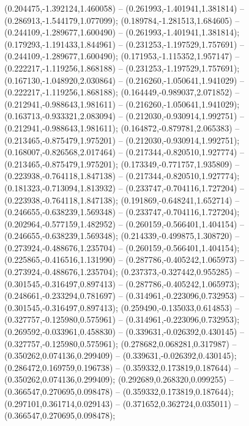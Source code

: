  (0.204475,-1.392124,1.460058) -- (0.261993,-1.401941,1.381814) -- (0.286913,-1.544179,1.077099);
 (0.189784,-1.281513,1.684605) -- (0.244109,-1.289677,1.600490) -- (0.261993,-1.401941,1.381814);
 (0.179293,-1.191433,1.844961) -- (0.231253,-1.197529,1.757691) -- (0.244109,-1.289677,1.600490);
 (0.171953,-1.115352,1.957147) -- (0.222217,-1.119256,1.868188) -- (0.231253,-1.197529,1.757691);
 (0.167130,-1.048920,2.030864) -- (0.216260,-1.050641,1.941029) -- (0.222217,-1.119256,1.868188);
 (0.164449,-0.989037,2.071852) -- (0.212941,-0.988643,1.981611) -- (0.216260,-1.050641,1.941029);
 (0.163713,-0.933321,2.083094) -- (0.212030,-0.930914,1.992751) -- (0.212941,-0.988643,1.981611);
 (0.164872,-0.879781,2.065383) -- (0.213465,-0.875479,1.975201) -- (0.212030,-0.930914,1.992751);
 (0.168007,-0.826568,2.017464) -- (0.217344,-0.820510,1.927774) -- (0.213465,-0.875479,1.975201);
 (0.173349,-0.771757,1.935809) -- (0.223938,-0.764118,1.847138) -- (0.217344,-0.820510,1.927774);
 (0.181323,-0.713094,1.813932) -- (0.233747,-0.704116,1.727204) -- (0.223938,-0.764118,1.847138);
 (0.191869,-0.648241,1.652714) -- (0.246655,-0.638239,1.569348) -- (0.233747,-0.704116,1.727204);
 (0.202964,-0.577159,1.482952) -- (0.260159,-0.566401,1.404154) -- (0.246655,-0.638239,1.569348);
 (0.214339,-0.499875,1.308720) -- (0.273924,-0.488676,1.235704) -- (0.260159,-0.566401,1.404154);
 (0.225865,-0.416516,1.131990) -- (0.287786,-0.405242,1.065973) -- (0.273924,-0.488676,1.235704);
 (0.237373,-0.327442,0.955285) -- (0.301545,-0.316497,0.897413) -- (0.287786,-0.405242,1.065973);
 (0.248661,-0.233294,0.781697) -- (0.314961,-0.223096,0.732953) -- (0.301545,-0.316497,0.897413);
 (0.259490,-0.135033,0.614853) -- (0.327757,-0.125980,0.575961) -- (0.314961,-0.223096,0.732953);
 (0.269592,-0.033961,0.458830) -- (0.339631,-0.026392,0.430145) -- (0.327757,-0.125980,0.575961);
 (0.278682,0.068281,0.317987) -- (0.350262,0.074136,0.299409) -- (0.339631,-0.026392,0.430145);
 (0.286472,0.169759,0.196738) -- (0.359332,0.173819,0.187644) -- (0.350262,0.074136,0.299409);
 (0.292689,0.268320,0.099255) -- (0.366547,0.270695,0.098478) -- (0.359332,0.173819,0.187644);
 (0.297101,0.361714,0.029143) -- (0.371652,0.362724,0.035011) -- (0.366547,0.270695,0.098478);
